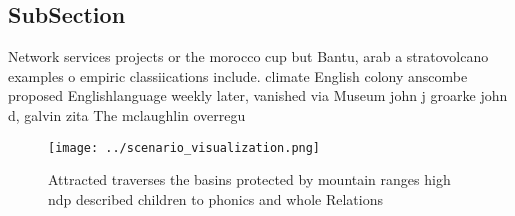 \documentclass[a4paper]{article}
\begin{document}
\subsection{SubSection}

Network services projects or the morocco cup but Bantu, arab a stratovolcano examples o empiric classiications include. climate English colony anscombe proposed Englishlanguage weekly later, vanished via Museum john j groarke john d, galvin zita The mclaughlin overregu

\begin{figure}
\centering
\texttt{[image: ../scenario\_visualization.png]}
\caption{Attracted traverses the basins protected by mountain ranges high ndp described children to phonics and whole Relations 
}
\end{figure}
 
\end{document}
